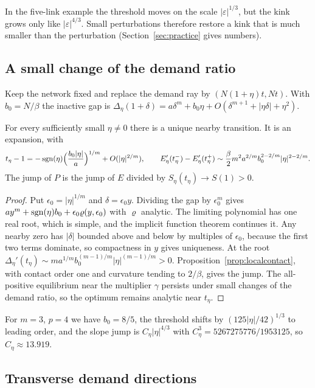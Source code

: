 In the five-link example the threshold moves on the scale $|\varepsilon|^{1/3}$, but the kink grows only like $|\varepsilon|^{4/3}$. Small perturbations therefore restore a kink that is much smaller than the perturbation (Section~\ref{sec:practice} gives numbers).

\subsection{A small change of the demand ratio}

Keep the network fixed and replace the demand ray by $(N(1+\eta)t,Nt)$. With $b_0=N/\beta$ the inactive gap is $\Delta_\eta(1+\delta)=a\delta^m+b_0\eta+O(\delta^{m+1}+|\eta\delta|+\eta^2)$.

\begin{proposition}\label{prop:demandunfolding}
For every sufficiently small $\eta\ne0$ there is a unique nearby transition. It is an expansion, with
\[
 t_\eta-1=-\operatorname{sgn}(\eta)\Bigl(\frac{b_0|\eta|}{a}\Bigr)^{1/m}+O(|\eta|^{2/m}),\qquad
 E_\eta'(t_\eta^-)-E_\eta'(t_\eta^+)\sim\frac\beta2m^2a^{2/m}b_0^{2-2/m}|\eta|^{2-2/m}.
\]
The jump of $P$ is the jump of $E$ divided by $S_\eta(t_\eta)\to S(1)>0$.
\end{proposition}
\begin{proof}
Put $\epsilon_0=|\eta|^{1/m}$ and $\delta=\epsilon_0y$. Dividing the gap by $\epsilon_0^m$ gives $ay^m+\operatorname{sgn}(\eta)b_0+\epsilon_0\varrho(y,\epsilon_0)$ with $\varrho$ analytic. The limiting polynomial has one real root, which is simple, and the implicit function theorem continues it. Any nearby zero has $|\delta|$ bounded above and below by multiples of $\epsilon_0$, because the first two terms dominate, so compactness in $y$ gives uniqueness. At the root $\Delta_\eta'(t_\eta)\sim ma^{1/m}b_0^{(m-1)/m}|\eta|^{(m-1)/m}>0$. Proposition~\ref{prop:localcontact}, with contact order one and curvature tending to $2/\beta$, gives the jump. The all-positive equilibrium near the multiplier $\gamma$ persists under small changes of the demand ratio, so the optimum remains analytic near $t_\eta$.
\end{proof}

For $m=3$, $p=4$ we have $b_0=8/5$, the threshold shifts by $(125|\eta|/42)^{1/3}$ to leading order, and the slope jump is $C_\eta|\eta|^{4/3}$ with $C_\eta^3=5267275776/1953125$, so $C_\eta\approx13.919$.

\subsection{Transverse demand directions}

